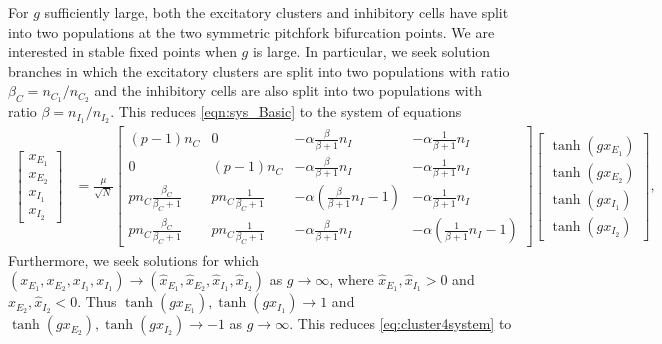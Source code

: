 \documentclass[11pt,reqno]{amsart}
\begin{document}
For $g$ sufficiently large, both the excitatory clusters and inhibitory cells have split into two populations at the two symmetric pitchfork bifurcation points. We are interested in stable fixed points when $g$ is large. In particular, we seek solution branches in which the excitatory clusters are split into two populations with ratio $\beta_C = n_{C_1}/n_{C_2}$ and the inhibitory cells are also split into two populations with ratio $\beta = n_{I_1}/n_{I_2}$. This reduces \cref{eqn:sys_Basic} to the system of equations
\begin{equation}\label{eq:cluster4system}
    \begin{aligned}
    \begin{bmatrix} x_{E_1} \\ x_{E_2} \\ x_{I_1} \\ x_{I_2} \end{bmatrix} 
    &= \frac{\mu}{\sqrt{N}} 
    \begin{bmatrix} 
       (p-1)n_C & 0 & -\alpha \frac{\beta}{\beta+1}n_I &  -\alpha \frac{1}{\beta+1}n_I \\
       0  & (p-1)n_C & -\alpha \frac{\beta}{\beta+1}n_I &  -\alpha \frac{1}{\beta+1}n_I \\
       p n_C \frac{\beta_C}{\beta_C+1} &
       p n_C \frac{1}{\beta_C+1} &
       -\alpha \left(\frac{\beta}{\beta+1}n_I-1\right) &  -\alpha \frac{1}{\beta+1}n_I \\
       p n_C \frac{\beta_C}{\beta_C+1} &
       p n_C \frac{1}{\beta_C+1} &
       -\alpha \frac{\beta}{\beta+1}n_I & -\alpha \left(\frac{1}{\beta+1}n_I - 1 \right)
    \end{bmatrix}
    \begin{bmatrix} \tanh(g x_{E_1}) \\ \tanh ( g x_{E_2} ) \\\tanh(g x_{I_1}) \\\tanh(g x_{I_2})  \end{bmatrix},
    \end{aligned}
\end{equation}
Furthermore, we seek solutions for which $(x_{E_1}, x_{E_2}, x_{I_1}, x_{I_1}) \rightarrow (\hat{x}_{E_1}, \hat{x}_{E_2}, \hat{x}_{I_1}, \hat{x}_{I_2})$ as $g \rightarrow \infty$, where $\hat{x}_{E_1}, \hat{x}_{I_1} > 0$ and $\hat{x}_{E_2}, \hat{x}_{I_2} < 0$. Thus $\tanh(g x_{E_1}), \tanh(g x_{I_1}) \rightarrow 1$ and $\tanh(g x_{E_2}), \tanh(g x_{I_2}) \rightarrow -1$ as $g \rightarrow \infty$. This reduces \cref{eq:cluster4system} to 
\end{document}
